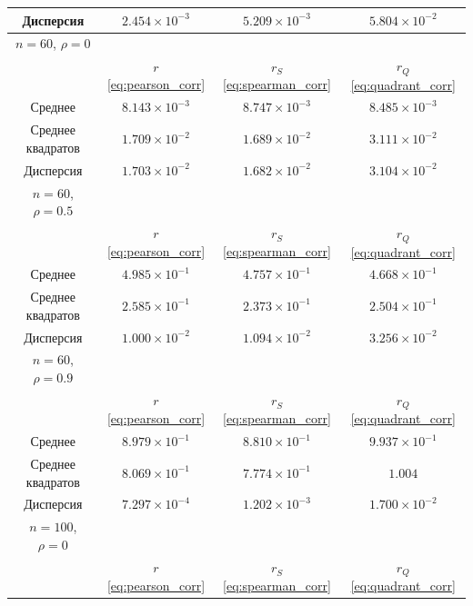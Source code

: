 \documentclass[12pt,a4paper]{article}
\begin{document}
\begin{table}[htbp!]
\begin{tabular}{ |c|c|c|c| }
			\hline
			Дисперсия & \( 2.454 \times 10^{-3} \) &
			\( 5.209 \times 10^{-3} \) & \( 5.804 \times 10^{-2} \) \\
			\hline
			\hline
			\( n = 60 \), \( \rho = 0 \) & & & \\
			\hline
			& \( r \) \eqref{eq:pearson_corr} & \( r_S \) \eqref{eq:spearman_corr} &
			\( r_Q \) \eqref{eq:quadrant_corr} \\
			\hline
			Среднее & \( 8.143 \times 10^{-3} \) & \( 8.747 \times 10^{-3} \) &
			\( 8.485 \times 10^{-3} \) \\
			\hline
			Среднее квадратов & \( 1.709 \times 10^{-2} \) &
			\( 1.689 \times 10^{-2} \) & \( 3.111 \times 10^{-2} \) \\
			\hline
			Дисперсия & \( 1.703 \times 10^{-2} \) &
			\( 1.682 \times 10^{-2} \) & \( 3.104 \times 10^{-2} \) \\
			\hline
			\hline
			\( n = 60 \), \( \rho = 0.5 \) & & & \\
			\hline
			& \( r \) \eqref{eq:pearson_corr} & \( r_S \) \eqref{eq:spearman_corr} &
			\( r_Q \) \eqref{eq:quadrant_corr} \\
			\hline
			Среднее & \( 4.985 \times 10^{-1} \) & \( 4.757 \times 10^{-1} \) &
			\( 4.668 \times 10^{-1} \) \\
			\hline
			Среднее квадратов & \(2.585 \times 10^{-1} \) &
			\( 2.373 \times 10^{-1} \) & \( 2.504 \times 10^{-1} \) \\
			\hline
			Дисперсия & \( 1.000 \times 10^{-2} \) &
			\( 1.094 \times 10^{-2} \) & \( 3.256 \times 10^{-2} \) \\
			\hline
			\hline
			\( n = 60 \), \( \rho = 0.9 \) & & & \\
			\hline
			& \( r \) \eqref{eq:pearson_corr} & \( r_S \) \eqref{eq:spearman_corr} &
			\( r_Q \) \eqref{eq:quadrant_corr} \\
			\hline
			Среднее & \( 8.979 \times 10^{-1} \) & \( 8.810 \times 10^{-1} \) &
			\( 9.937 \times 10^{-1} \) \\
			\hline
			Среднее квадратов & \(8.069 \times 10^{-1} \) &
			\( 7.774 \times 10^{-1} \) & \( 1.004 \) \\
			\hline
			Дисперсия & \( 7.297 \times 10^{-4} \) &
			\( 1.202 \times 10^{-3} \) & \( 1.700 \times 10^{-2} \) \\
			\hline
			\hline
			\( n = 100 \), \( \rho = 0 \) & & & \\
			\hline
			& \( r \) \eqref{eq:pearson_corr} & \( r_S \) \eqref{eq:spearman_corr} &
			\( r_Q \) \eqref{eq:quadrant_corr} \\

\end{tabular}
\end{table}
\end{document}
